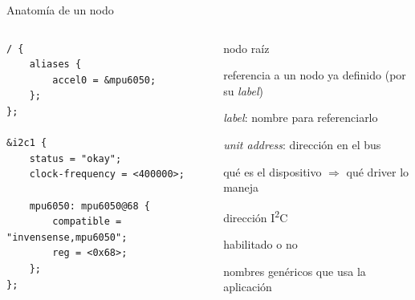 \documentclass[aspectratio=169]{beamer}
\begin{document}
\begin{frame}[fragile]{Anatomía de un nodo}
\begin{columns}[T]
\begin{lstlisting}[language=dts]
/ {
    aliases {
        accel0 = &mpu6050;
    };
};

&i2c1 {
    status = "okay";
    clock-frequency = <400000>;

    mpu6050: mpu6050@68 {
        compatible = "invensense,mpu6050";
        reg = <0x68>;
    };
};
\end{lstlisting}
\footnotesize
\begin{description}
    \item[\texttt{/}] nodo raíz
    \item[\texttt{\&i2c1}] referencia a un nodo ya definido (por su \emph{label})
    \item[\texttt{mpu6050:}] \emph{label}: nombre para referenciarlo
    \item[\texttt{@68}] \emph{unit address}: dirección en el bus
    \item[\texttt{compatible}] \alert{qué es} el dispositivo $\Rightarrow$ qué driver lo maneja
    \item[\texttt{reg}] dirección I\textsuperscript{2}C
    \item[\texttt{status}] habilitado o no
    \item[\texttt{aliases}] nombres \alert{genéricos} que usa la aplicación
\end{description}
\end{columns}
\end{frame}
\end{document}
